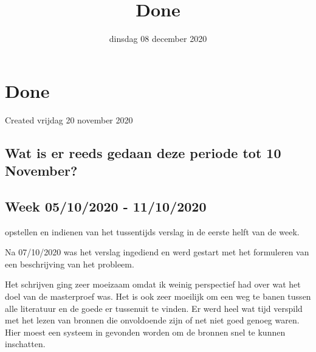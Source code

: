 \documentclass{scrartcl}
\title{Done}
\date{dinsdag 08 december 2020}
\author{}
\begin{document}
\maketitle

		\section{Done}

Created vrijdag 20 november 2020



\subsection{Wat is er reeds gedaan deze periode tot 10 November?}



\subsection{Week 05/10/2020 - 11/10/2020}

opstellen en indienen van het tussentijds verslag in de eerste helft van de week.

Na 07/10/2020 was het verslag ingediend en werd gestart met het formuleren van een beschrijving van het probleem.

Het schrijven ging zeer moeizaam omdat ik weinig perspectief had over wat het doel van de masterproef was. Het is ook zeer moeilijk om een weg te banen tussen alle literatuur en de goede er tussenuit te vinden. Er werd heel wat tijd verspild met het lezen van bronnen die onvoldoende zijn of net niet goed genoeg waren. Hier moest een systeem in gevonden worden om de bronnen snel te kunnen inschatten. 
\end{document}
